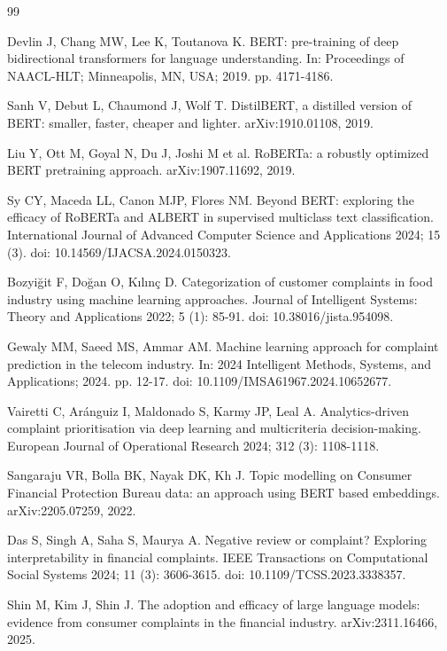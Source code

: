 \documentclass{elektr}
\begin{document}
\begin{thebibliography}{99}
\setlength{\itemsep}{1pt}
\setlength{\parsep}{0pt}

 Devlin J, Chang MW, Lee K, Toutanova K. BERT: pre-training of deep bidirectional transformers for language understanding. In: Proceedings of NAACL-HLT; Minneapolis, MN, USA; 2019. pp. 4171-4186.

 Sanh V, Debut L, Chaumond J, Wolf T. DistilBERT, a distilled version of BERT: smaller, faster, cheaper and lighter. arXiv:1910.01108, 2019.

 Liu Y, Ott M, Goyal N, Du J, Joshi M et al. RoBERTa: a robustly optimized BERT pretraining approach. arXiv:1907.11692, 2019.

 Sy CY, Maceda LL, Canon MJP, Flores NM. Beyond BERT: exploring the efficacy of RoBERTa and ALBERT in supervised multiclass text classification. International Journal of Advanced Computer Science and Applications 2024; 15 (3). doi: 10.14569/IJACSA.2024.0150323.

 Bozyiğit F, Doğan O, Kılınç D. Categorization of customer complaints in food industry using machine learning approaches. Journal of Intelligent Systems: Theory and Applications 2022; 5 (1): 85-91. doi: 10.38016/jista.954098.

 Gewaly MM, Saeed MS, Ammar AM. Machine learning approach for complaint prediction in the telecom industry. In: 2024 Intelligent Methods, Systems, and Applications; 2024. pp. 12-17. doi: 10.1109/IMSA61967.2024.10652677.

 Vairetti C, Aránguiz I, Maldonado S, Karmy JP, Leal A. Analytics-driven complaint prioritisation via deep learning and multicriteria decision-making. European Journal of Operational Research 2024; 312 (3): 1108-1118.

 Sangaraju VR, Bolla BK, Nayak DK, Kh J. Topic modelling on Consumer Financial Protection Bureau data: an approach using BERT based embeddings. arXiv:2205.07259, 2022.

 Das S, Singh A, Saha S, Maurya A. Negative review or complaint? Exploring interpretability in financial complaints. IEEE Transactions on Computational Social Systems 2024; 11 (3): 3606-3615. doi: 10.1109/TCSS.2023.3338357.

 Shin M, Kim J, Shin J. The adoption and efficacy of large language models: evidence from consumer complaints in the financial industry. arXiv:2311.16466, 2025.


\end{thebibliography}
\end{document}
